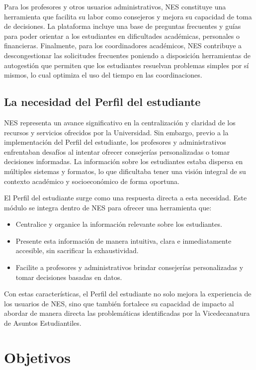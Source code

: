 Para los profesores y otros usuarios administrativos, \gls{NES} constituye una herramienta que facilita su labor como consejeros y mejora su capacidad de toma de decisiones. La plataforma incluye una base de preguntas frecuentes y guías para poder orientar a los estudiantes en dificultades académicas, personales o financieras. Finalmente, para los coordinadores académicos, \gls{NES} contribuye a descongestionar las solicitudes frecuentes poniendo a disposición herramientas de autogestión que permiten que los estudiantes resuelvan problemas simples por sí mismos, lo cual optimiza el uso del tiempo en las coordinaciones.

\subsection{La necesidad del Perfil del estudiante}

\gls{NES} representa un avance significativo en la centralización y claridad de los recursos y servicios ofrecidos por la Universidad. Sin embargo, previo a la implementación del Perfil del estudiante, los profesores y administrativos enfrentaban desafíos al intentar ofrecer consejerías personalizadas o tomar decisiones informadas. La información sobre los estudiantes estaba dispersa en múltiples sistemas y formatos, lo que dificultaba tener una visión integral de su contexto académico y socioeconómico de forma oportuna.

El Perfil del estudiante surge como una respuesta directa a esta necesidad. Este módulo se integra dentro de \gls{NES} para ofrecer una herramienta que:
\begin{itemize}
	\item Centralice y organice la información relevante sobre los estudiantes.
	\item Presente esta información de manera intuitiva, clara e inmediatamente accesible, sin sacrificar la exhaustividad.
	\item Facilite a profesores y administrativos brindar consejerías personalizadas y tomar decisiones basadas en datos.
\end{itemize}

Con estas características, el Perfil del estudiante no solo mejora la experiencia de los usuarios de \gls{NES}, sino que también fortalece su capacidad de impacto al abordar de manera directa las problemáticas identificadas por la Vicedecanatura de Asuntos Estudiantiles.

\section{Objetivos}

